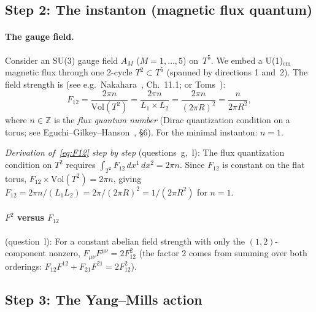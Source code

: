 \documentclass[11pt,a4paper]{article}
\theoremstyle{definition}
\theoremstyle{remark}
\begin{document}
\subsection{Step 2: The instanton (magnetic flux quantum)}
\label{app:step2}

\paragraph{The gauge field.}
Consider an SU(3) gauge field $A_M$ ($M=1,\ldots,5$) on~$T^5$.
We embed a U(1)$_{\mathrm{em}}$ magnetic flux through one 2-cycle
$T^2 \subset T^5$ (spanned by directions 1 and~2).
The field strength is (see e.g.\ Nakahara~\cite{Nakahara2003},
Ch.~11.1; or Toms~\cite{Toms1983}):
\begin{equation}\label{eq:F12}
  F_{12} = \frac{2\pi n}{\mathrm{Vol}(T^2)}
         = \frac{2\pi n}{L_1 \times L_2}
         = \frac{2\pi n}{(2\pi R)^2}
         = \frac{n}{2\pi R^2},
\end{equation}
where $n \in \mathbb{Z}$ is the \emph{flux quantum number}
(Dirac quantization condition on a torus;
see Eguchi--Gilkey--Hanson~\cite{EguchiGilkeyHanson1980}, \S 6).
For the minimal instanton: $n=1$.

\emph{Derivation of~\eqref{eq:F12} step by step} (questions~g,~l):
The flux quantization condition on $T^2$ requires
$\int_{T^2} F_{12}\,dx^1\,dx^2 = 2\pi n$.
Since $F_{12}$ is constant on the flat torus,
$F_{12} \times \mathrm{Vol}(T^2) = 2\pi n$,
giving $F_{12} = 2\pi n / (L_1 L_2) = 2\pi/(2\pi R)^2 = 1/(2\pi R^2)$
for $n=1$.

\paragraph{$F^2$ versus $F_{12}$} (question~l):
For a constant abelian field strength with only the $(1,2)$-component nonzero,
$F_{\mu\nu}F^{\mu\nu} = 2 F_{12}^2$
(the factor 2 comes from summing over both orderings:
$F_{12}F^{12} + F_{21}F^{21} = 2F_{12}^2$).

\subsection{Step 3: The Yang--Mills action}
\label{app:step3}
\end{document}
